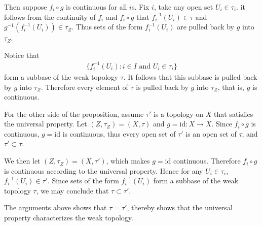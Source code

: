 \documentclass{article}
\begin{document}
Then suppose $f_i\circ g$ is continuous for all $i$s. Fix $i$, take any open set $U_i\in \tau_i$. it follows from the continuity of $f_i$ and $f_i\circ g$ that $f_i^{-1}(U_i)\in \tau $ and 
$g^{-1}(f^{-1}_i(U_i) )\in \tau_Z$. Thus sets of the form $f_i^{-1}(U_i)$ are pulled back by $g$ into $\tau_Z$.


Notice that
\begin{align*}
	\{f_{i}^{-1}(U_i):i\in I \mbox{ and } U_i \in \tau_i \}
\end{align*}
form a subbase of the weak topology $\tau$. It follows that this subbase is pulled back by $g$ into $\tau_Z$. Therefore every element of $\tau$ is pulled back by $g$ into $\tau_Z$, that is, $g$ is continuous.

\vspace{3ex}

For the other side of the proposition, assume $\tau'$ is a topology on $X$ that satisfies the universal property. Let $(Z,\tau_Z) =(X,\tau)$ and $g=$id$:X\to X$. Since $f_i\circ g$ is continuous, $g=$id is continuous, thus every open set of $\tau'$ is an open set of $\tau$, and $\tau' \subset \tau$.
\begin{center}
\end{center}

We then let $(Z,\tau_Z)=(X,\tau')$, which makes $g=$id continuous. Therefore $f_i\circ g$ is continuous according to the universal property. Hence for any $U_i \in \tau_i$, $f_i^{-1}(U_i) \in \tau'$. Since sets of the form $f_i^{-1}(U_i)$ form a subbase of the weak topology $\tau$, we may conclude that $\tau \subset \tau'$.

\begin{center}
\end{center}

The arguments above shows that $\tau=\tau'$, thereby shows that the universal property characterizes the weak topology.
\end{document}
